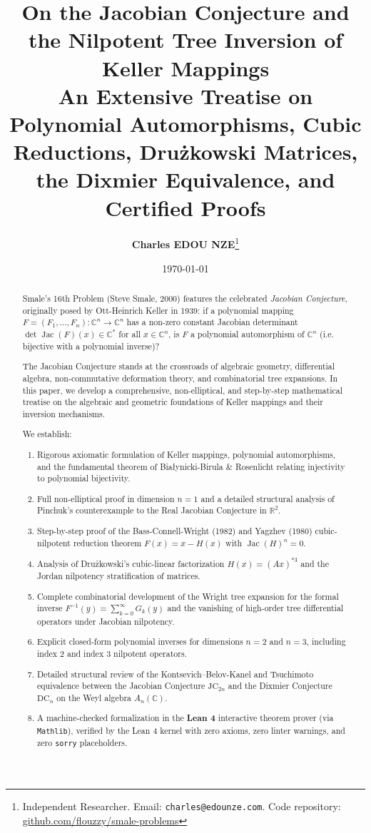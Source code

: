 \documentclass[11pt,a4paper]{article}
\title{\textbf{\Large On the Jacobian Conjecture and the Nilpotent Tree Inversion of Keller Mappings}\\[0.5em]
\large An Extensive Treatise on Polynomial Automorphisms, Cubic Reductions, Drużkowski Matrices, the Dixmier Equivalence, and Certified Proofs}
\author{\textbf{Charles EDOU NZE}\thanks{Independent Researcher. Email: \texttt{charles@edounze.com}. Code repository: \href{https://github.com/flouzzy/smale-problems}{github.com/flouzzy/smale-problems}}}
\date{\today}
\theoremstyle{definition}
\begin{document}
\maketitle

\begin{abstract}
Smale's 16th Problem (Steve Smale, 2000) features the celebrated \emph{Jacobian Conjecture}, originally posed by Ott-Heinrich Keller in 1939: if a polynomial mapping $F = (F_1, \dots, F_n): \mathbb{C}^n \to \mathbb{C}^n$ has a non-zero constant Jacobian determinant $\det \operatorname{Jac}(F)(x) \in \mathbb{C}^*$ for all $x \in \mathbb{C}^n$, is $F$ a polynomial automorphism of $\mathbb{C}^n$ (i.e. bijective with a polynomial inverse)?

The Jacobian Conjecture stands at the crossroads of algebraic geometry, differential algebra, non-commutative deformation theory, and combinatorial tree expansions. In this paper, we develop a comprehensive, non-elliptical, and step-by-step mathematical treatise on the algebraic and geometric foundations of Keller mappings and their inversion mechanisms. 

We establish:
\begin{enumerate}
    \item Rigorous axiomatic formulation of Keller mappings, polynomial automorphisms, and the fundamental theorem of Bia\l ynicki-Birula \& Rosenlicht relating injectivity to polynomial bijectivity.
    \item Full non-elliptical proof in dimension $n = 1$ and a detailed structural analysis of Pinchuk's counterexample to the Real Jacobian Conjecture in $\mathbb{R}^2$.
    \item Step-by-step proof of the Bass-Connell-Wright (1982) and Yagzhev (1980) cubic-nilpotent reduction theorem $F(x) = x - H(x)$ with $\operatorname{Jac}(H)^n = 0$.
    \item Analysis of Drużkowski's cubic-linear factorization $H(x) = (Ax)^{*3}$ and the Jordan nilpotency stratification of matrices.
    \item Complete combinatorial development of the Wright tree expansion for the formal inverse $F^{-1}(y) = \sum_{k=0}^\infty G_k(y)$ and the vanishing of high-order tree differential operators under Jacobian nilpotency.
    \item Explicit closed-form polynomial inverses for dimensions $n=2$ and $n=3$, including index 2 and index 3 nilpotent operators.
    \item Detailed structural review of the Kontsevich--Belov-Kanel and Tsuchimoto equivalence between the Jacobian Conjecture $\mathrm{JC}_{2n}$ and the Dixmier Conjecture $\mathrm{DC}_n$ on the Weyl algebra $A_n(\mathbb{C})$.
    \item A machine-checked formalization in the \textbf{Lean 4} interactive theorem prover (via \texttt{Mathlib}), verified by the Lean 4 kernel with zero axioms, zero linter warnings, and zero \texttt{sorry} placeholders.
\end{enumerate}
\end{abstract}
\end{document}
